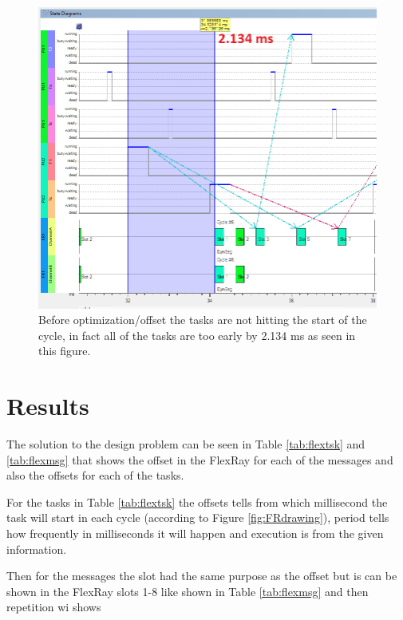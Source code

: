 \begin{figure}[h!]
	\begin{center}
		\includegraphics[width=0.8\linewidth]{img/FR-offset}
		\caption{Before optimization/offset the tasks are not hitting the start of the cycle, in fact all of the tasks are too early by 2.134 ms as seen in this figure.}
		\label{fig:FRoffset}
	\end{center}
\end{figure}



\section{Results}

The solution to the design problem can be seen in Table \ref{tab:flextsk} and \ref{tab:flexmsg} that shows the offset in the FlexRay for each of the messages and also the offsets for each of the tasks. 

For the tasks in Table \ref{tab:flextsk} the offsets tells from which millisecond the task will start in each cycle (according to Figure \ref{fig:FRdrawing}), period tells how frequently in milliseconds it will happen and execution is from the given information. 

Then for the messages the slot had the same purpose as the offset but is can be shown in the FlexRay slots 1-8 like shown in  Table \ref{tab:flexmsg} and then repetition wi shows 



